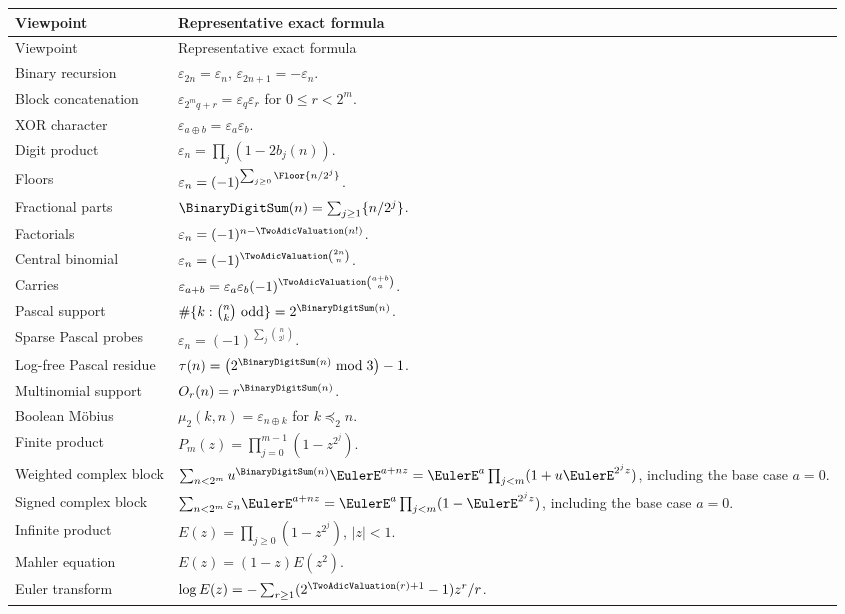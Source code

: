 \documentclass[11pt,oneside]{article}
\numberwithin{equation}{section}
\theoremstyle{definition}
\theoremstyle{remark}
\newcommand{\eps}{\varepsilon}
\newcommand{\xor}{\mathbin{\oplus}}
\newcommand{\submask}{\mathrel{\preccurlyeq_2}}
\begin{document}
\renewcommand{\arraystretch}{1.18}
\begin{longtable}{@{}p{}p{}@{}}
\toprule
Viewpoint & Representative exact formula \\
\midrule
\endfirsthead
\toprule
Viewpoint & Representative exact formula \\
\midrule
\endhead
Binary recursion & \(\eps_{2n}=\eps_n\), \(\eps_{2n+1}=-\eps_n\). \\
Block concatenation & \(\eps_{2^mq+r}=\eps_q\eps_r\) for \(0\le r<2^m\). \\
XOR character & \(\eps_{a\xor b}=\eps_a\eps_b\). \\
Digit product & \(\eps_n=\prod_j(1-2b_j(n))\). \\
Floors & \(\eps_n=(-1)^{\sum_{j\ge0}\Floor{n/2^j}}\). \\
Fractional parts & \(\BinaryDigitSum(n)=\sum_{j\ge1}\{n/2^j\}\). \\
Factorials & \(\eps_n=(-1)^{n-\TwoAdicValuation(n!)}\). \\
Central binomial & \(\eps_n=(-1)^{\TwoAdicValuation\binom{2n}{n}}\). \\
Carries & \(\eps_{a+b}=\eps_a\eps_b(-1)^{\TwoAdicValuation\binom{a+b}{a}}\). \\
Pascal support & \(\#\{k:\binom nk\text{ odd}\}=2^{\BinaryDigitSum(n)}\). \\
Sparse Pascal probes & \(\eps_n=(-1)^{\sum_j\binom{n}{2^j}}\). \\
Log-free Pascal residue & \(\tau(n)=\bigl(2^{\BinaryDigitSum(n)}\bmod3\bigr)-1\). \\
Multinomial support & \(O_r(n)=r^{\BinaryDigitSum(n)}\). \\
Boolean M\"obius & \(\mu_2(k,n)=\eps_{n\xor k}\) for \(k\submask n\). \\
Finite product & \(P_m(z)=\prod_{j=0}^{m-1}(1-z^{2^j})\). \\
Weighted complex block & \(\sum_{n<2^m}u^{\BinaryDigitSum(n)}\EulerE^{a+nz}=\EulerE^a\prod_{j<m}(1+u\EulerE^{2^jz})\), including the base case \(a=0\). \\
Signed complex block & \(\sum_{n<2^m}\eps_n\EulerE^{a+nz}=\EulerE^a\prod_{j<m}(1-\EulerE^{2^jz})\), including the base case \(a=0\). \\
Infinite product & \(E(z)=\prod_{j\ge0}(1-z^{2^j})\), \(|z|<1\). \\
Mahler equation & \(E(z)=(1-z)E(z^2)\). \\
Euler transform & \(\log E(z)=-\sum_{r\ge1}(2^{\TwoAdicValuation(r)+1}-1)z^r/r\). \\

\end{longtable}
\end{document}
